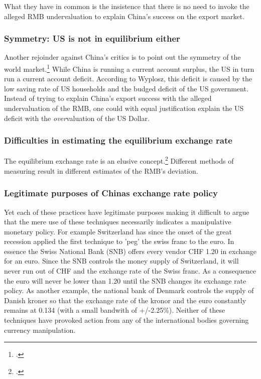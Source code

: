 \documentclass[11pt]{article}
\begin{document}
What they have in common is the insistence that there is no need to invoke the alleged RMB undervaluation to explain China's success on the export market.

\subsubsection{Symmetry: US is not in equilibrium either}

Another rejoinder against China's critics is to point out the symmetry of the world market.\footnote{\cite[pp. 39-40]{Wyplosz2010}.} While China is running a current account surplus, the US in turn run a current account deficit. According to Wyplosz, this deficit is caused by the low saving rate of US households and the budged deficit of the US government. Instead of trying to explain China's export success with the alleged undervaluation of the RMB, one could with equal justification explain the US deficit with the \emph{over}valuation of the US Dollar. 

\subsubsection{Difficulties in estimating the equilibrium exchange rate}

The equilibrium exchange rate is an elusive concept.\footnote{\cite[p. 16]{Yu2010}.} Different methods of measuring result in different estimates of the RMB's deviation. 





\subsubsection{Legitimate purposes of Chinas exchange rate policy}


Yet each of these practices have legitimate purposes making it difficult 
to argue that the mere use of these techniques necessarily indicates a 
manipulative monetary policy. For example Switzerland has since the 
onset of the great recession applied the first technique to 'peg' the 
swiss franc to the euro. In essence the Swiss National Bank (SNB) offers 
every vendor CHF 1.20 in exchange for an euro. Since the SNB controls 
the money supply of Switzerland, it will never run out of CHF and the 
exchange rate of the Swiss franc. As a consequence the euro will never 
be lower than 1.20 until the SNB changes its exchange rate policy.  As 
another example, the national bank of Denmark controls the supply of 
Danish kroner so that the exchange rate of the kronor and the euro 
constantly remains at 0.134 (with a small bandwith of +/-2.25\%).  
Neither of these techniques have provoked action from any of the 
international bodies governing currency manipulation.
\end{document}
